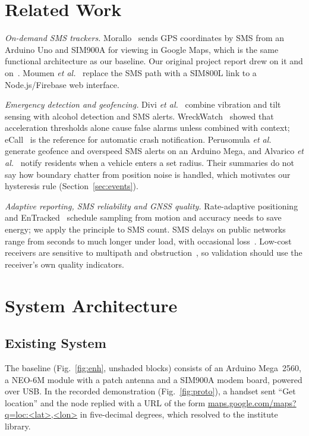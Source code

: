 \documentclass[conference]{IEEEtran}
\begin{document}
\section{Related Work}
\textit{On-demand SMS trackers.} Morallo~\cite{morallo2021} sends GPS coordinates by SMS from an Arduino Uno and SIM900A for viewing in Google Maps, which is the same functional architecture as our baseline. Our original project report drew on it and on~\cite{tummanapally2021}. Moumen \textit{et al.}~\cite{moumen2023} replace the SMS path with a SIM800L link to a Node.js/Firebase web interface.

\textit{Emergency detection and geofencing.} Divi \textit{et al.}~\cite{divi2023} combine vibration and tilt sensing with alcohol detection and SMS alerts. WreckWatch~\cite{white2011} showed that acceleration thresholds alone cause false alarms unless combined with context; eCall~\cite{ecall2015} is the reference for automatic crash notification. Perusomula \textit{et al.}~\cite{perusomula2023} generate geofence and overspeed SMS alerts on an Arduino Mega, and Alvarico \textit{et al.}~\cite{alvarico2024} notify residents when a vehicle enters a set radius. Their summaries do not say how boundary chatter from position noise is handled, which motivates our hysteresis rule (Section~\ref{sec:events}).

\textit{Adaptive reporting, SMS reliability and GNSS quality.} Rate-adaptive positioning~\cite{paek2010} and EnTracked~\cite{kjaergaard2009} schedule sampling from motion and accuracy needs to save energy; we apply the principle to SMS count. SMS delays on public networks range from seconds to much longer under load, with occasional loss~\cite{pries2006,zerfos2006}. Low-cost receivers are sensitive to multipath and obstruction~\cite{hamza2024}, so validation should use the receiver's own quality indicators.

\section{System Architecture}\label{sec:arch}



\subsection{Existing System}\label{sec:existing}
The baseline (Fig.~\ref{fig:enh}, unshaded blocks) consists of an Arduino Mega~2560, a NEO-6M module with a patch antenna and a SIM900A modem board, powered over USB. In the recorded demonstration (Fig.~\ref{fig:proto}), a handset sent ``Get location'' and the node replied with a URL of the form \url{maps.google.com/maps?q=loc:<lat>,<lon>} in five-decimal degrees, which resolved to the institute library.
\end{document}
